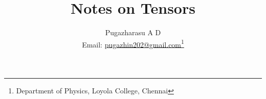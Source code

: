 \documentclass[a4paper,12pt]{book}
\begin{document}
\title{Notes on  Tensors}
\author{Pugazharasu A D \\
	Email: \href{mailto:pugazhin202@gmail.com}{pugazhin202@gmail.com}\footnote{Department of Physics, Loyola College, Chennai}}


\frontmatter
\maketitle 
\nopagebreak
\tableofcontents

\mainmatter



\backmatter
\end{document}
